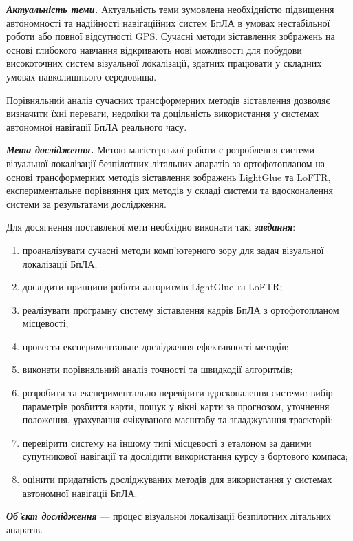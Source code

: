 \documentclass[a4paper, 12pt, titlepage]{article}
\begin{document}
\textbf{\textit{Актуальність теми.}} Актуальність теми зумовлена необхідністю підвищення автономності та надійності навігаційних систем БпЛА в умовах нестабільної роботи або повної відсутності GPS. Сучасні методи зіставлення зображень на основі глибокого навчання відкривають нові можливості для побудови високоточних систем візуальної локалізації, здатних працювати у складних умовах навколишнього середовища.

Порівняльний аналіз сучасних трансформерних методів зіставлення дозволяє визначити їхні переваги, недоліки та доцільність використання у системах автономної навігації БпЛА реального часу.

\textbf{\textit{Мета дослідження.}} Метою магістерської роботи є розроблення системи візуальної локалізації безпілотних літальних апаратів за ортофотопланом на основі трансформерних методів зіставлення зображень LightGlue та LoFTR, експериментальне порівняння цих методів у складі системи та вдосконалення системи за результатами дослідження.

Для досягнення поставленої мети необхідно виконати такі \textbf{\textit{завдання}}:
\begin{enumerate}[label=\arabic*)]
    \item проаналізувати сучасні методи комп’ютерного зору для задач візуальної локалізації БпЛА;
    \item дослідити принципи роботи алгоритмів LightGlue та LoFTR;
    \item реалізувати програмну систему зіставлення кадрів БпЛА з ортофотопланом місцевості;
    \item провести експериментальне дослідження ефективності методів;
    \item виконати порівняльний аналіз точності та швидкодії алгоритмів;
    \item розробити та експериментально перевірити вдосконалення системи: вибір параметрів розбиття карти, пошук у вікні карти за прогнозом, уточнення положення, урахування очікуваного масштабу та згладжування траєкторії;
    \item перевірити систему на іншому типі місцевості з еталоном за даними супутникової навігації та дослідити використання курсу з бортового компаса;
    \item оцінити придатність досліджуваних методів для використання у системах автономної навігації БпЛА.
\end{enumerate}

\textbf{\textit{Об’єкт дослідження}} --- процес візуальної локалізації безпілотних літальних апаратів.
\end{document}
